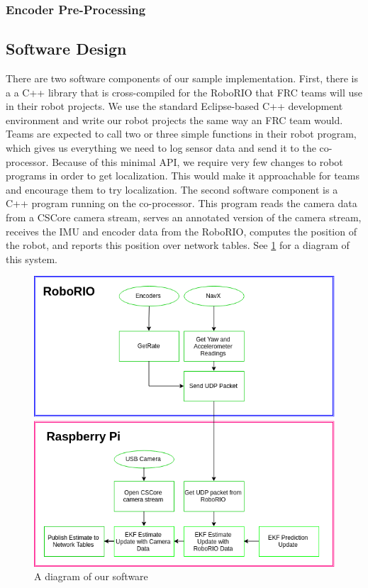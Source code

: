 \documentclass{article}
\begin{document}
    \subsubsection{Encoder Pre-Processing}

  \subsection{Software Design}

    There are two software components of our sample implementation. First, there is a a C++ library that is cross-compiled for the RoboRIO that FRC teams will use in their robot projects. We use the standard Eclipse-based C++ development environment and write our robot projects the same way an FRC team would. Teams are expected to call two or three simple functions in their robot program, which gives us everything we need to log sensor data and send it to the co-processor. Because of this minimal API, we require very few changes to robot programs in order to get localization. This would make it approachable for teams and encourage them to try localization. The second software component is a C++ program running on the co-processor. This program reads the camera data from a CSCore camera stream, serves an annotated version of the camera stream, receives the IMU and encoder data from the RoboRIO, computes the position of the robot, and reports this position over network tables. See \ref{fig:software_diagram} for a diagram of this system.

    \begin{figure}[H]
      \centering
      \includegraphics[width=1\linewidth]{./images/MQP_System_Chart.png}
      \caption{A diagram of our software}
      \label{fig:software_diagram}
    \end{figure}
\end{document}
